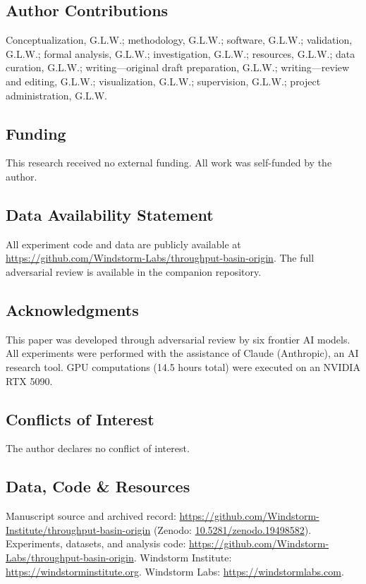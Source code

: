 \documentclass[11pt]{article}
\begin{document}
\subsection*{Author Contributions}

Conceptualization, G.L.W.; methodology, G.L.W.; software, G.L.W.; validation, G.L.W.; formal analysis, G.L.W.; investigation, G.L.W.; resources, G.L.W.; data curation, G.L.W.; writing---original draft preparation, G.L.W.; writing---review and editing, G.L.W.; visualization, G.L.W.; supervision, G.L.W.; project administration, G.L.W.

\subsection*{Funding}

This research received no external funding. All work was self-funded by the author.

\subsection*{Data Availability Statement}

All experiment code and data are publicly available at \url{https://github.com/Windstorm-Labs/throughput-basin-origin}. The full adversarial review is available in the companion repository.

\subsection*{Acknowledgments}

This paper was developed through adversarial review by six frontier AI models. All experiments were performed with the assistance of Claude (Anthropic), an AI research tool. GPU computations (14.5 hours total) were executed on an NVIDIA RTX 5090.

\subsection*{Conflicts of Interest}

The author declares no conflict of interest.

\subsection*{Data, Code \& Resources}
\noindent Manuscript source and archived record: \url{https://github.com/Windstorm-Institute/throughput-basin-origin} (Zenodo: \href{https://doi.org/10.5281/zenodo.19498582}{10.5281/zenodo.19498582}). Experiments, datasets, and analysis code: \url{https://github.com/Windstorm-Labs/throughput-basin-origin}. Windstorm Institute: \url{https://windstorminstitute.org}. Windstorm Labs: \url{https://windstormlabs.com}.
\end{document}
